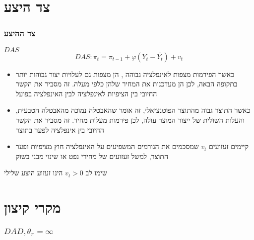 \documentclass[usenames,dvipsnames]{beamer}
\begin{document}
\begin{RTL}
\section{צד היצע}
\begin{frame}
    \frametitle{צד ההיצע}
    \begin{block}{$DAS$}
    $$DAS : \pi_t = \pi_{t-1} + \varphi \left(Y_t - \bar{Y_t}\right) + v_t $$
        \begin{itemize}
            \item כאשר הפירמות מצפות לאינפלציה גבוהה , הן מצפות גם לעלויות יצור גבוהות יותר בתקופה הבאה, לכן הן מעדכנות את המחיר שלהן כלפי מעלה. זה מסביר את הקשר החיובי בין הציפיות לאינפלציה לבין האינפלציה בפועל
            \item כאשר התוצר גבוה מהתוצר הפוטנציאלי, זה אומר שהאבטלה נמוכה מהאבטלה הטבעית, והעלות השולית של ייצור המוצר עולה, לכן פירמות מעלות מחיר. זה מסביר את הקשר החיובי בין אינפלציה לפער בתוצר
            \item קיימים זעזועים $v_t$ שמסכמים את הגורמים המשפיעים על האינפלציה חוץ מציפיות ופער התוצר, למשל זעזועים של מחירי נפט או שינוי מבני בשוק
        \end{itemize}
    \end{block}

    \begin{alertblock}{שימו לב}
        $v_t > 0$ הינו זעזוע היצע שלילי
    \end{alertblock}

\end{frame}

\section{מקרי קיצון}
\begin{frame}
    \frametitle{$DAD, \theta_\pi = \infty$}
    \begin{center}
\end{center}
\end{frame}
\end{RTL}
\end{document}

